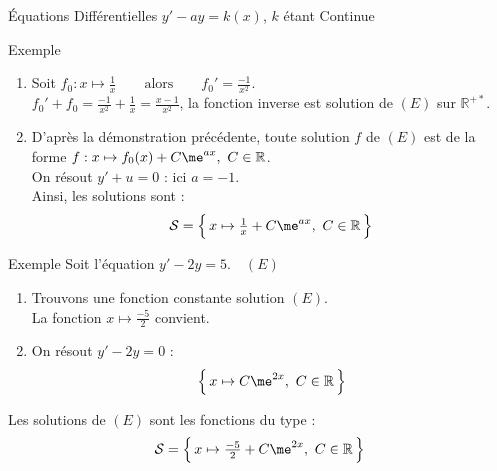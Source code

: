 \documentclass{cours}
\begin{document}
\begin{Gpartie}{Équations Différentielles $y'-ay=k(x)$, $k$ étant Continue}
\begin{Spartie}{Exemple}
            \begin{enumerate}
                \item Soit $f_0:x\mapsto\frac{1}{x}\qquad\text{alors}\qquad f_0'=\frac{-1}{x^2}$. \\
                $f_0'+f_0=\frac{-1}{x^2}+\frac{1}{x}=\frac{x-1}{x^2}$, la fonction inverse est solution de $(E)$ sur $\mathbb{R^{+*}}$.
                \item D'après la démonstration précédente, toute solution $f$ de $(E)$ est de la forme $f:x\mapsto f_0(x)+C\me^{ax},\ C\in\mathbb{R}$. \\
                On résout $y'+u=0$ : ici $a=-1$. \\
                Ainsi, les solutions sont :
                \[\mathcal{S}=\Big\{\,x\mapsto\tfrac{1}{x}+C\me^{ax},\ C\in\mathbb{R}\,\Big\}\]
            \end{enumerate}
        \end{Spartie}
        \begin{Spartie}{Exemple} 
            Soit l'équation $y'-2y=5$.$\quad(E)$
            \begin{enumerate}
                \item Trouvons une fonction constante solution $(E)$. \\
                La fonction $x\mapsto\frac{-5}{2}$ convient.
                \item On résout $y'-2y=0$ :
                \[\Big\{\,x\mapsto C\me^{2x},\ C\in\mathbb{R}\,\Big\}\]
            \end{enumerate}

            Les solutions de $(E)$ sont les fonctions du type :
            \[\mathcal{S}=\Big\{\,x\mapsto\tfrac{-5}{2}+C\me^{2x},\ C\in\mathbb{R}\,\Big\}\]
        \end{Spartie}
    \end{Gpartie}
\end{document}
